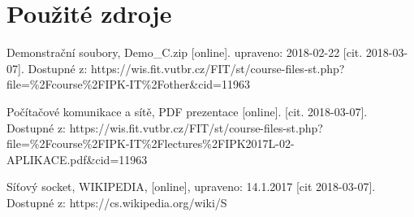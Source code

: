 \documentclass[11pt]{article}
\begin{document}
	\section{Použité zdroje}
	\begin{flushleft}
		[1] Demonstrační soubory, Demo\_C.zip [online]. upraveno: 2018-02-22 [cit. 2018-03-07]. Dostupné z: https://wis.fit.vutbr.cz/FIT/st/course-files-st.php?file=\%2Fcourse\%2FIPK-IT\%2Fother\&cid=11963\par	
	\end{flushleft}	
	\begin{flushleft}
		[2] Počítačové komunikace a sítě, PDF prezentace [online]. [cit. 2018-03-07]. Dostupné z: https://wis.fit.vutbr.cz/FIT/st/course-files-st.php?file=\%2Fcourse\%2FIPK-IT\%2Flectures\%2FIPK2017L-02-APLIKACE.pdf\&cid=11963\par	
	\end{flushleft}
	\begin{flushleft}
		[3] Síťový socket, WIKIPEDIA, [online], upraveno: 14.1.2017 [cit 2018-03-07]. Dostupné z: https://cs.wikipedia.org/wiki/S%
	\end{flushleft}
\end{document}
